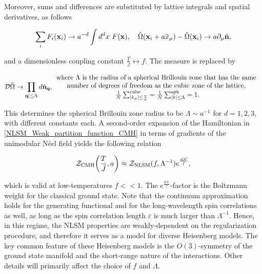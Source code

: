 Moreover, sums and differences are substituted by lattice integrals and spatial derivatives, as follows

\begin{equation}
    \sum_{i} F_i({\bf x}_i) \rightarrow a^{-d} \int d^d x \textnormal{ } F({\bf x}), \quad \hat{\Omega}({\bf x}_i + a \hat{x}_{\mu}) - \hat{\Omega}({\bf x}_i) \rightarrow a \partial_{\mu} \hat{{\bf n}}, 
\end{equation}

and a dimensionless coupling constant $\frac{T}{\bar{J}} \leftrightarrow f$. The measure is replaced by 

\begin{equation}
    \mathcal{D}\hat{\Omega} \rightarrow \prod_{{\bf q}| \leq \Lambda} d\hat{\bf n}_{{\bf q}}, \begin{array}{cc}
         \textnormal{where $\Lambda$ is the radius of a spherical Brillouin zone that has the same } \\
         \textnormal{number of degrees of freedom as the cubic zone of the lattice, } \\
         \begin{array}{cc}
              \frac{1}{N}\sum_{|k_{\mu}| \leq \frac{\pi}{a}}^{\textnormal{cube}} = \frac{1}{N}\sum_{|k| \leq \Lambda}^{\textnormal{sph}} = 1.
         \end{array}
    \end{array}
\end{equation}

This determines the spherical Brillouin zone radius to be $\Lambda \sim a^{-1}$ for $d=1,2,3$, with different constants each. A second-order expansion of the Hamiltonian in \cref{NLSM_Weak_partition_function_CMH} in terms of gradients of the unimodular Néel field yields the following relation

\begin{equation}
    \mathcal{Z}_{\textnormal{CMH}}\bigg(\frac{T}{\bar{J}}, a\bigg) \approx \mathcal{Z}_{\textnormal{NLSM}}(f, \Lambda^{-1}) e^{\frac{d \mathcal{N}}{f}},
\end{equation}

which is valid at low-temperatures $f << 1$. The $e^{\frac{d \mathcal{N}}{f}}$-factor is the Boltzmann weight for the classical ground state. 
Note that the continuum approximation holds for the generating functional and for the long-wavelength spin correlations  as well, as long as the spin correlation length $\varepsilon$ is much larger than $\Lambda^{-1}$. 
Hence, in this regime, the NLSM properties are weakly-dependent on the regularization procedure, and therefore it serves as a model for diverse Heisenberg models. 
The key common feature of these Heisenberg models is the $O(3)$-symmetry of the ground state manifold and the short-range nature of the interactions. Other details will primarily affect the choice of $f$ and $\Lambda$.\\

